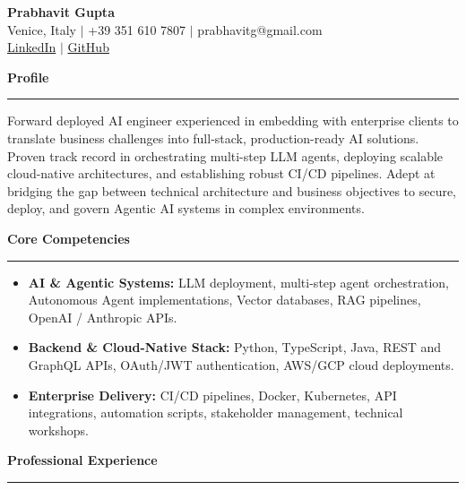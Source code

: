 \documentclass[11pt,a4paper]{article}
\begin{document}
\begin{center}
    {\huge \textbf{Prabhavit Gupta}} \\
    \vspace{0.2em}
    Venice, Italy $|$ +39 351 610 7807 $|$ prabhavitg@gmail.com \\
    \href{https://www.linkedin.com/in/prabhavit/}{LinkedIn} $|$ \href{https://github.com/prab-gupta}{GitHub}
\end{center}

\vspace{0.5em}
\noindent\textbf{\Large Profile} \\
\rule{\textwidth}{0.4pt}
Forward deployed AI engineer experienced in embedding with enterprise clients to translate business challenges into full-stack, production-ready AI solutions. Proven track record in orchestrating multi-step LLM agents, deploying scalable cloud-native architectures, and establishing robust CI/CD pipelines. Adept at bridging the gap between technical architecture and business objectives to secure, deploy, and govern Agentic AI systems in complex environments.

\vspace{1em}
\noindent\textbf{\Large Core Competencies} \\
\rule{\textwidth}{0.4pt}
\begin{itemize}[leftmargin=*]
\item \textbf{AI \& Agentic Systems:} LLM deployment, multi-step agent orchestration, Autonomous Agent implementations, Vector databases, RAG pipelines, OpenAI / Anthropic APIs.
\item \textbf{Backend \& Cloud-Native Stack:} Python, TypeScript, Java, REST and GraphQL APIs, OAuth/JWT authentication, AWS/GCP cloud deployments.
\item \textbf{Enterprise Delivery:} CI/CD pipelines, Docker, Kubernetes, API integrations, automation scripts, stakeholder management, technical workshops.
\end{itemize}

\vspace{1em}
\noindent\textbf{\Large Professional Experience} \\
\rule{\textwidth}{0.4pt}
\end{document}
